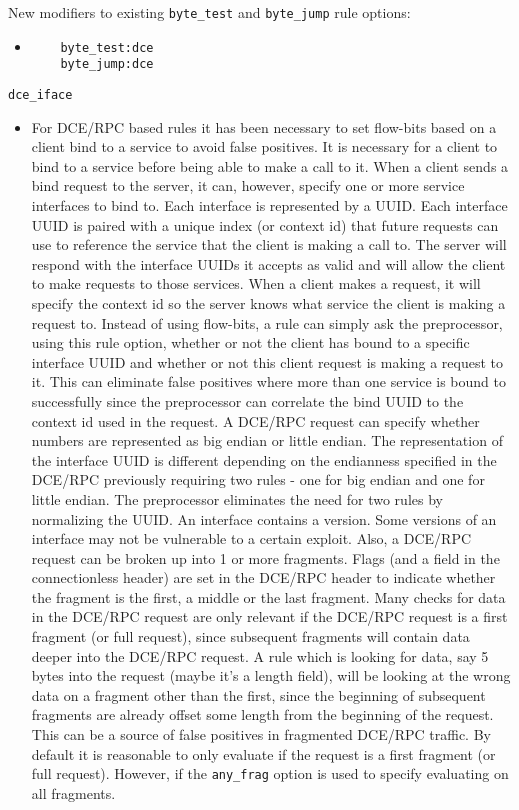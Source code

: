 \documentclass[english]{report}
\begin{document}
New modifiers to existing \texttt{byte\_test} and \texttt{byte\_jump} rule
options:

\begin{itemize}
\item[]
\begin{verbatim}
    byte_test:dce
    byte_jump:dce
\end{verbatim}
\end{itemize}

\texttt{dce\_iface}
\label{dcerpc2:dce_iface}
\begin{itemize}

\item[] For DCE/RPC based rules it has been necessary to set flow-bits based on
a client bind to a service to avoid false positives.  It is necessary for a
client to bind to a service before being able to make a call to it. When a
client sends a bind request to the server, it can, however, specify one or more
service interfaces to bind to. Each interface is represented by a UUID. Each
interface UUID is paired with a unique index (or context id) that future
requests can use to reference the service that the client is making a call to.
The server will respond with the interface UUIDs it accepts as valid and will
allow the client to make requests to those services.  When a client makes a
request, it will specify the context id so the server knows what service the
client is making a request to. Instead of using flow-bits, a rule can simply
ask the preprocessor, using this rule option, whether or not the client has
bound to a specific interface UUID and whether or not this client request is
making a request to it. This can eliminate false positives where more than one
service is bound to successfully since the preprocessor can correlate the bind
UUID to the context id used in the request.  A DCE/RPC request can specify
whether numbers are represented as big endian or little endian. The
representation of the interface UUID is different depending on the endianness
specified in the DCE/RPC previously requiring two rules - one for big endian
and one for little endian.  The preprocessor eliminates the need for two rules
by normalizing the UUID.  An interface contains a version. Some versions of an
interface may not be vulnerable to a certain exploit.  Also, a DCE/RPC request
can be broken up into 1 or more fragments. Flags (and a field in the
connectionless header) are set in the DCE/RPC header to indicate whether the
fragment is the first, a middle or the last fragment. Many checks for data in
the DCE/RPC request are only relevant if the DCE/RPC request is a first
fragment (or full request), since subsequent fragments will contain data deeper
into the DCE/RPC request. A rule which is looking for data, say 5 bytes into
the request (maybe it's a length field), will be looking at the wrong data on a
fragment other than the first, since the beginning of subsequent fragments are
already offset some length from the beginning of the request. This can be a
source of false positives in fragmented DCE/RPC traffic. By default it is
reasonable to only evaluate if the request is a first fragment (or full
request).  However, if the \texttt{any\_frag} option is used to specify
evaluating on all fragments.\\


\end{itemize}
\end{document}
